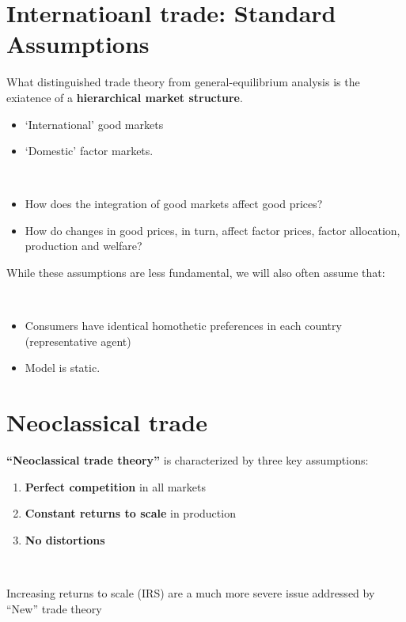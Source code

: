 \section{Internatioanl trade: Standard Assumptions}

What distinguished trade theory from general-equilibrium analysis is the exiatence of a \textbf{hierarchical market structure}.
\begin{itemize}
    \item `International' good markets
    \item `Domestic' factor markets.
\end{itemize}

\begin{question}
    \

    \begin{itemize}
        \item How does the integration of good markets affect good prices?
        \item How do changes in good prices, in turn, affect factor prices, factor allocation, production and welfare?
    \end{itemize}
\end{question}

While these assumptions are less fundamental, we will also often
assume that:
\begin{assumption}
    \

    \begin{itemize}
        \item Consumers have identical homothetic preferences in each country
        (representative agent)
        \item Model is static.
    \end{itemize}    
\end{assumption}

\section{Neoclassical trade}
\textbf{``Neoclassical trade theory''} is characterized by three key assumptions:
\begin{enumerate}
    \item \textbf{Perfect competition} in all markets
    \item \textbf{Constant returns to scale} in production
    \item \textbf{No distortions} 
\end{enumerate}

\begin{note}
    \

    Increasing returns to scale (IRS) are a much more severe issue
addressed by “New” trade theory
\end{note}

